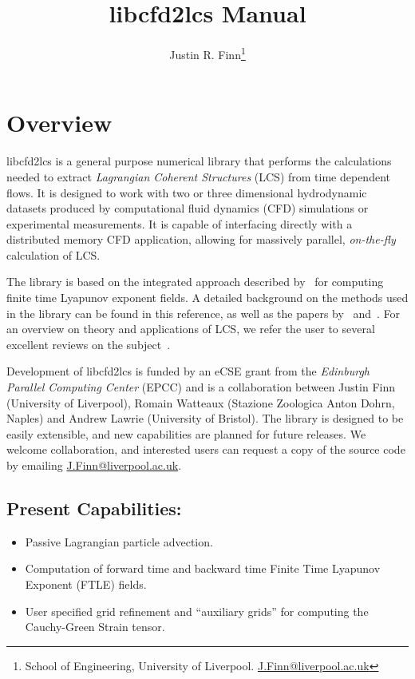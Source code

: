 \documentclass[letterpaper,11pt]{article}
\title{libcfd2lcs Manual}
\author{Justin R. Finn\thanks{School of Engineering, University of Liverpool.  \href{mailto:J.Finn@liverpool.ac.uk}{J.Finn@liverpool.ac.uk}}}
\begin{document}
\maketitle
\section{Overview}
libcfd2lcs is a general purpose numerical library that performs the calculations needed to extract \emph{Lagrangian Coherent Structures} (LCS) from time dependent flows.  It is designed to work with two or three dimensional hydrodynamic datasets produced by computational fluid dynamics (CFD) simulations or experimental measurements.  It is capable of interfacing directly with a distributed memory CFD application, allowing for massively parallel, \emph{on-the-fly} calculation of LCS.

The library is based on the integrated approach described by~\cite{finn2013integrated} for computing finite time Lyapunov exponent fields.  A detailed background on the methods used in the library can be found in this reference, as well as the papers by~\cite{brunton2010fast} and~\cite{leung2011eulerian}.  For an overview on theory and applications of LCS, we refer the user to several excellent reviews on the subject~\cite{haller2015lagrangian,peacock2015introduction,peacock2010introduction,samelson2013lagrangian}.

Development of libcfd2lcs is funded by an eCSE grant from the \emph{Edinburgh Parallel Computing Center} (EPCC) and is a collaboration between Justin Finn (University of Liverpool), Romain Watteaux (Stazione Zoologica Anton Dohrn, Naples) and Andrew Lawrie (University of Bristol).  The library is designed to be easily extensible, and new capabilities are planned for future releases.  We welcome collaboration, and interested users can request a copy of the source code by emailing \href{mailto:J.Finn@liverpool.ac.uk}{J.Finn@liverpool.ac.uk}.
 
\subsection*{Present Capabilities:}
 \begin{itemize}
 \item Passive Lagrangian particle advection.
 \item Computation of forward time and backward time Finite Time Lyapunov Exponent (FTLE) fields.
 \item User specified grid refinement and ``auxiliary grids'' for computing the Cauchy-Green Strain tensor. 
\end{itemize}
\end{document}
